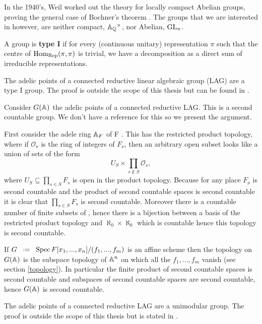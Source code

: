 In the 1940's, Weil worked out the theory for locally compact Abelian groups, proving the general case of Bochner's theorem \cite[Thm. 4.18]{follandCourseAbstractHarmonic2016a}. The groups that we are interested in however, are neither compact,  \(\A_\Q^\times\), nor Abelian, \(\operatorname{GL}_n\).

A group is \textbf{type I} if for every (continuous unitary) representation \(\pi\) such that the centre of \(\operatorname{Hom}_\mathrm{Rep}(\pi, \pi)\) is trivial, we have a decomposition as a  direct sum of irreducible representations. 

\begin{example}
	The adelic points of a connected reductive linear algebraic group (LAG) are a type I group. The proof is outside the scope of this thesis but can be found in \cite[Thm. 1.7 + Thm. 2.3]{deitmarTraceClassGroups2017}.
\end{example}

\begin{example}
	Consider \(G(\A)\) the adelic points of a connected reductive LAG. This is a second countable group. We don't have a reference for this so we present the argument. 
	
	First consider the adele ring \(\A_F\) of F . This has the restricted product topology, where if \(\mathcal{O}_\nu\) is the ring of integers of \(F_\nu\), then an arbitrary open subset looks like a union of sets of the form 
	\[U_S \times \prod_{s\notin S} \mathcal{O}_s,\]
	where \(U_S\subseteq \prod_{s\in S}F_s\) is open in the product topology. 
	Because for any place \(F_\nu\) is second countable and the product of second countable spaces is second countable it is clear that \(\prod_{s\in S} F_s\) is second countable. Moreover there is a countable number of finite subsets of \Z, hence there is a bijection between a basis of the restricted product topology and \(\aleph_0\times \aleph_0 \) which is countable hence this topology is second countable.
	
	If \(G \defeq \Spec F[x_1, ..., x_n]/(f_1, ..., f_m)\) is an affine scheme then the topology on \(G(\A)\) is the subspace topology of \(\A^n\) on which all the \(f_1, ..., f_m\) vanish (see section \ref{topology}). In particular the finite product of second countable spaces is second countable and subspaces of second countable spaces are second countable, hence \(G(\A)\) is second countable. 
\end{example}

\begin{example}
	The adelic points of a connected reductive LAG are a unimodular group. The proof is outside the scope of this thesis but is stated in \cite[Lem. 2]{conradCOMPACTNESSVOLUMEADELIC}.
\end{example}

